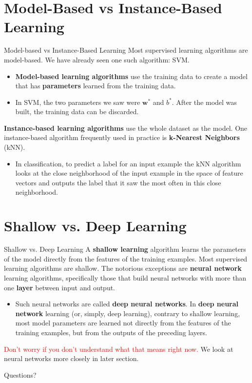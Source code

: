 \documentclass[9pt,dvipsnames]{beamer}
\begin{document}
\section{Model-Based vs Instance-Based Learning}
\begin{frame}{Model-based vs Instance-Based Learning}
    Most supervised learning algorithms are model-based. We have already seen one such algorithm: SVM.
    \begin{itemize}
        \item \textbf{Model-based learning algorithms} use the training data to create a model that has \textbf{parameters} learned from the training data.
        \item In SVM, the two parameters we saw were $\mathbf{w}^{*}$ and $b^{*}$. After the model was built, the training data can be discarded.
    \end{itemize}
    \textbf{Instance-based learning algorithms} use the whole dataset as the model. One instance-based algorithm frequently used in practice is \textbf{k-Nearest Neighbors} (kNN).
    \begin{itemize}
        \item In classification, to predict a label for an input example the $\mathrm{kNN}$ algorithm looks at the close neighborhood of the input example in the space of feature vectors and outputs the label that it saw the most often in this close neighborhood.
    \end{itemize}
\end{frame}

\section{Shallow vs. Deep Learning}
\begin{frame}{Shallow vs. Deep Learning}
    A \textbf{shallow learning} algorithm learns the parameters of the model directly from the features of the training examples. Most supervised learning algorithms are shallow. The notorious exceptions are \textbf{neural network} learning algorithms, specifically those that build neural networks with more than one \textbf{layer} between input and output.
    \begin{itemize}
        \item Such neural networks are called \textbf{deep neural networks}. In \textbf{deep neural network} learning (or, simply, deep learning), contrary to shallow learning, most model parameters are learned not directly from the features of the training examples, but from the outputs of the preceding layers.
    \end{itemize}
    \textcolor{red}{Don't worry if you don't understand what that means right now.} We look at neural networks more closely in later section.
\end{frame}
\begin{frame}
    \begin{center}
        \Huge Questions?
    \end{center}
\end{frame}
\end{document}
